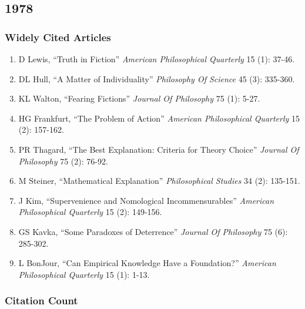 \documentclass[
  10pt,
  letterpaper,
  DIV=11,
  numbers=noendperiod,
  twoside]{scrartcl}
\providecommand{\tightlist}{%
  \setlength{\itemsep}{0pt}\setlength{\parskip}{0pt}}\usepackage{longtable,booktabs,array}
\begin{document}
\newpage

\subsection{1978}\label{section-2}

\subsubsection*{Widely Cited Articles}\label{widely-cited-articles-2}

\begin{enumerate}
\def\labelenumi{\arabic{enumi}.}
\tightlist
\item
  D Lewis, ``Truth in Fiction'' \emph{American Philosophical Quarterly}
  15 (1): 37-46.
\item
  DL Hull, ``A Matter of Individuality'' \emph{Philosophy Of Science} 45
  (3): 335-360.
\item
  KL Walton, ``Fearing Fictions'' \emph{Journal Of Philosophy} 75 (1):
  5-27.
\item
  HG Frankfurt, ``The Problem of Action'' \emph{American Philosophical
  Quarterly} 15 (2): 157-162.
\item
  PR Thagard, ``The Best Explanation: Criteria for Theory Choice''
  \emph{Journal Of Philosophy} 75 (2): 76-92.
\item
  M Steiner, ``Mathematical Explanation'' \emph{Philosophical Studies}
  34 (2): 135-151.
\item
  J Kim, ``Supervenience and Nomological Incommensurables''
  \emph{American Philosophical Quarterly} 15 (2): 149-156.
\item
  GS Kavka, ``Some Paradoxes of Deterrence'' \emph{Journal Of
  Philosophy} 75 (6): 285-302.
\item
  L BonJour, ``Can Empirical Knowledge Have a Foundation?''
  \emph{American Philosophical Quarterly} 15 (1): 1-13.
\end{enumerate}

\subsubsection*{Citation Count}\label{citation-count-2}
\end{document}
